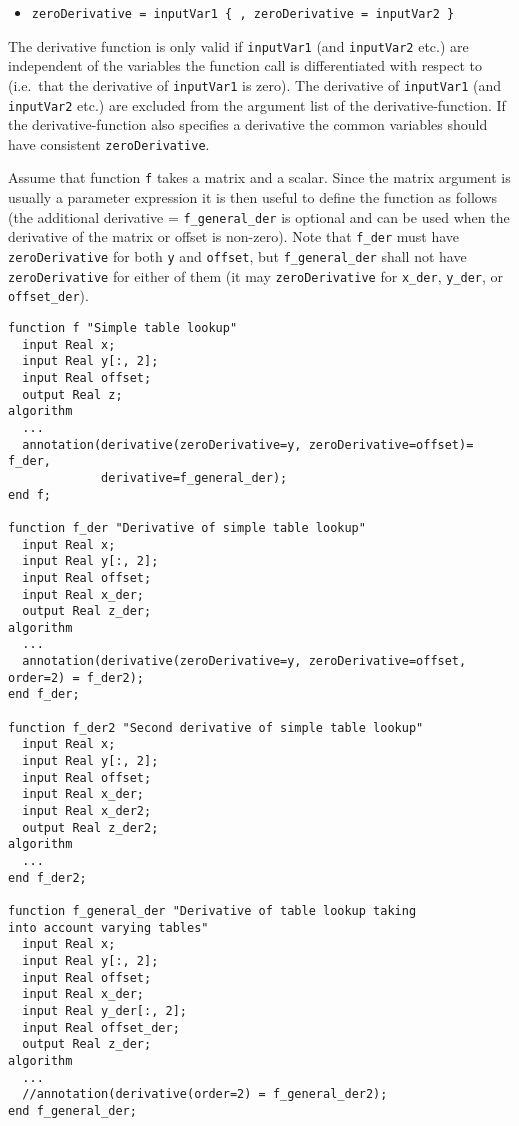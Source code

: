 \begin{itemize}
\item
  \lstinline[language=grammar]!zeroDerivative = inputVar1 { , zeroDerivative = inputVar2 }!
\end{itemize}

The derivative function is only valid if \lstinline!inputVar1! (and \lstinline!inputVar2! etc.)
are independent of the variables the function call is differentiated
with respect to (i.e.\ that the derivative of \lstinline!inputVar1! is zero). The
derivative of \lstinline!inputVar1! (and \lstinline!inputVar2! etc.) are excluded from the
argument list of the derivative-function. If the derivative-function
also specifies a derivative the common variables should have consistent
\lstinline!zeroDerivative!.

\begin{nonnormative}
Assume that function \lstinline!f! takes a matrix and a scalar.
Since the matrix argument is usually a parameter expression it is then
useful to define the function as follows (the additional derivative =
\lstinline!f_general_der! is optional and can be used when the derivative of
the matrix or offset is non-zero). Note that \lstinline!f_der! must have
\lstinline!zeroDerivative! for both \lstinline!y! and \lstinline!offset!, but \lstinline!f_general_der! shall not have
\lstinline!zeroDerivative! for either of them (it may \lstinline!zeroDerivative! for \lstinline!x_der!,
\lstinline!y_der!, or \lstinline!offset_der!).

\begin{lstlisting}[language=modelica]
function f "Simple table lookup"
  input Real x;
  input Real y[:, 2];
  input Real offset;
  output Real z;
algorithm
  ...
  annotation(derivative(zeroDerivative=y, zeroDerivative=offset)= f_der,
             derivative=f_general_der);
end f;

function f_der "Derivative of simple table lookup"
  input Real x;
  input Real y[:, 2];
  input Real offset;
  input Real x_der;
  output Real z_der;
algorithm
  ...
  annotation(derivative(zeroDerivative=y, zeroDerivative=offset, order=2) = f_der2);
end f_der;

function f_der2 "Second derivative of simple table lookup"
  input Real x;
  input Real y[:, 2];
  input Real offset;
  input Real x_der;
  input Real x_der2;
  output Real z_der2;
algorithm
  ...
end f_der2;

function f_general_der "Derivative of table lookup taking
into account varying tables"
  input Real x;
  input Real y[:, 2];
  input Real offset;
  input Real x_der;
  input Real y_der[:, 2];
  input Real offset_der;
  output Real z_der;
algorithm
  ...
  //annotation(derivative(order=2) = f_general_der2);
end f_general_der;
\end{lstlisting}
\end{nonnormative}


